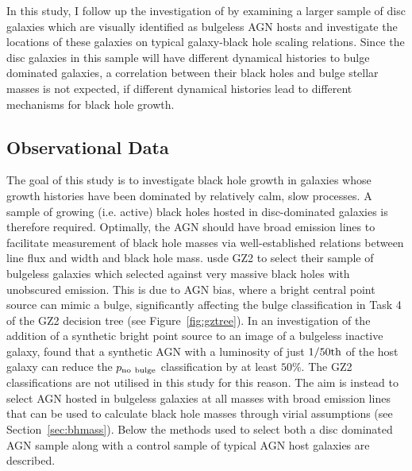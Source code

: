 In this study, I follow up the investigation of \citeauthor{Simmons13} by examining a larger sample of disc galaxies which are visually identified as bulgeless AGN hosts and investigate the locations of these galaxies on typical galaxy-black hole scaling relations. Since the disc galaxies in this sample will have different dynamical histories to bulge dominated galaxies, a correlation between their black holes and bulge stellar masses is not expected, if different dynamical histories lead to different mechanisms for black hole growth. 



%
%
\subsection{Observational Data}\label{sec:data}
%
%

The goal of this study is to investigate black hole growth in galaxies whose growth histories have been dominated by relatively calm, slow processes. A sample of growing (i.e. active) black holes hosted in disc-dominated galaxies is therefore required. Optimally, the AGN should have broad emission lines to facilitate measurement of black hole masses via well-established relations between line flux and width and black hole mass. \citeauthor{Simmons13} usde GZ2 to select their sample of bulgeless galaxies which selected against very massive black holes with unobscured emission. This is due to AGN bias, where a bright central point source can mimic a bulge, significantly affecting the bulge classification in Task 4 of the GZ2 decision tree (see Figure~\ref{fig:gztree}). In an investigation of the addition of a synthetic bright point source to an image of a bulgeless inactive galaxy, \citeauthor{Simmons13} found that a synthetic AGN with a luminosity of just $1/50\rm{th}$ of the host galaxy can reduce the $p_{\rm{no}~\rm{bulge}}$ classification by at least $50\%$. The GZ2 classifications are not utilised in this study for this reason. The aim is instead to select AGN hosted in bulgeless galaxies at all masses with broad emission lines that can be used to calculate black hole masses through virial assumptions (see Section~\ref{sec:bhmass}). Below the methods used to select both a disc dominated AGN sample along with a control sample of typical AGN host galaxies are described.

